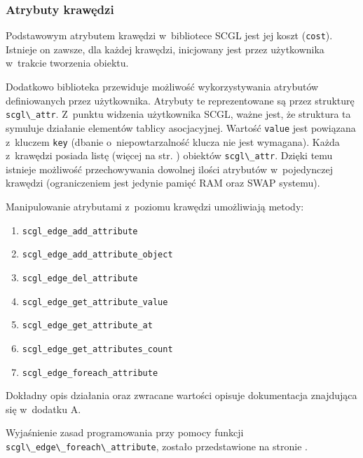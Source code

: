\documentclass[a4paper,12pt,polish,oneside,openright]{thesis}
\newcommand\code[1]{\lstinline[style=line]{#1}}
\begin{document}
\subsubsection*{Atrybuty krawędzi}
Podstawowym atrybutem krawędzi w~bibliotece SCGL jest jej koszt (\code{cost}).
Istnieje on zawsze, dla każdej krawędzi, inicjowany jest przez użytkownika w~trakcie tworzenia obiektu.

Dodatkowo biblioteka przewiduje możliwość wykorzystywania atrybutów definiowanych przez użytkownika.
Atrybuty te reprezentowane są przez strukturę \code{scgl\_attr}.
Z~punktu widzenia użytkownika SCGL, ważne jest, że struktura ta symuluje działanie elementów tablicy asocjacyjnej.
Wartość \code{value} jest powiązana z~kluczem \code{key} (dbanie o~niepowtarzalność klucza nie jest wymagana).
Każda z~krawędzi posiada listę (więcej na str. \pageref{chap:lists}) obiektów \code{scgl\_attr}.
Dzięki temu istnieje możliwość przechowywania dowolnej ilości atrybutów w~pojedynczej krawędzi (ograniczeniem jest jedynie pamięć RAM oraz SWAP systemu).

Manipulowanie atrybutami z~poziomu krawędzi umożliwiają metody:
\begin{enumerate}
	\item \code{scgl_edge_add_attribute}
	\item \code{scgl_edge_add_attribute_object}
	\item \code{scgl_edge_del_attribute}
	\item \code{scgl_edge_get_attribute_value}
	\item \code{scgl_edge_get_attribute_at}
	\item \code{scgl_edge_get_attributes_count}
	\item \code{scgl_edge_foreach_attribute}
\end{enumerate}
Dokładny opis działania oraz zwracane wartości opisuje dokumentacja znajdująca się w~dodatku A.

Wyjaśnienie zasad programowania przy pomocy funkcji \code{scgl\_edge\_foreach\_attribute}, zostało przedstawione na stronie \pageref{sec:foreach}.
\end{document}
